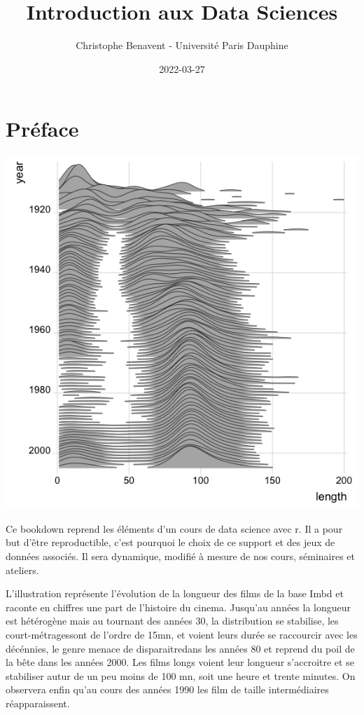 \documentclass[
]{book}
\title{Introduction aux Data Sciences}
\author{Christophe Benavent - Université Paris Dauphine}
\date{2022-03-27}
\begin{document}
\maketitle

{
\setcounter{tocdepth}{1}
\tableofcontents
}
\hypertarget{pruxe9face}{%
\chapter{Préface}\label{pruxe9face}}

\includegraphics{./Images/ggridge.png}

Ce bookdown reprend les éléments d'un cours de data science avec r. Il a pour but d'être reproductible, c'est pourquoi le choix de ce support et des jeux de données associés. Il sera dynamique, modifié à mesure de nos cours, séminaires et ateliers.

L'illustration représente l'évolution de la longueur des films de la base Imbd et raconte en chiffres une part de l'histoire du cinema. Jusqu'au années la longueur est hétérogène mais au tournant des années 30, la distribution se stabilise, les court-métragessont de l'ordre de 15mn, et voient leurs durée se raccourcir avec les décénnies, le genre menace de disparaitredans les années 80 et reprend du poil de la bête dans les années 2000. Les films longs voient leur longueur s'accroitre et se stabiliser autur de un peu moins de 100 mn, soit une heure et trente minutes. On observera enfin qu'au cours des années 1990 les film de taille intermédiaires réapparaissent.
\end{document}
